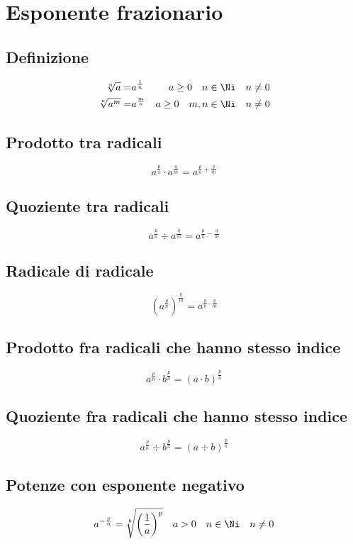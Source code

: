 \chapter{Esponente frazionario}
\section{Definizione}
\begin{align*}
\sqrt[n]{a}=&a^{\frac{1}{n}}&a\geq 0\quad n\in\Ni
\quad n\neq 0\\
\sqrt[n]{a^m}=&a^{\frac{m}{n}}&a\geq 0\quad m,n\in\Ni
\quad n\neq 0
\end{align*}
\section{Prodotto tra radicali}
\begin{equation*}
a^{\frac{p}{n}}\cdot a^{\frac{q}{m}}=a^{\frac{p}{n}+\frac{q}{m}}
\end{equation*}
\section{Quoziente tra radicali}
\begin{equation*}
a^{\frac{p}{n}}\div a^{\frac{q}{m}}=a^{\frac{p}{n}-\frac{q}{m}}
\end{equation*}
\section{Radicale di radicale}
\begin{equation*}
\left(a^{\frac{p}{n}}\right)^{\frac{q}{m}}=a^{\frac{p}{n}\cdot\frac{q}{m}}
\end{equation*}
\section{Prodotto fra radicali che hanno stesso indice}
\begin{equation*}
a^{\frac{p}{n}}\cdot b^{\frac{p}{n}}=\left(a\cdot b\right)^{\frac{p}{n}}
\end{equation*}
\section{Quoziente fra radicali che hanno stesso indice}
\begin{equation*}
a^{\frac{p}{n}}\div b^{\frac{p}{n}}=\left(a\div b\right)^{\frac{p}{n}}
\end{equation*}
\section{Potenze con esponente negativo}
\begin{equation*}
a^{-\frac{p}{n}}=\sqrt[b]{\left(\dfrac{1}{a}\right)^p}\quad a>0\quad n\in\Ni
\quad n\neq 0
\end{equation*}
